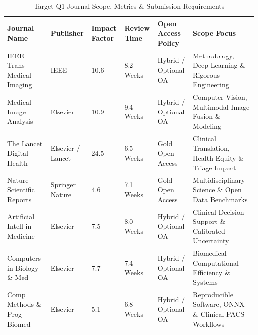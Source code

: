 \begin{table}[t]
\centering
\caption{Target Q1 Journal Scope, Metrics & Submission Requirements}
\label{tab:Table_6_04_02_Target_Journal_Comparison_Matrix}
\begin{tabular}{llllll}
\toprule
\textbf{Journal Name} & \textbf{Publisher} & \textbf{Impact Factor} & \textbf{Review Time} & \textbf{Open Access Policy} & \textbf{Scope Focus} \\
\midrule
IEEE Trans Medical Imaging & IEEE & 10.6 & 8.2 Weeks & Hybrid / Optional OA & Methodology, Deep Learning \& Rigorous Engineering \\
Medical Image Analysis & Elsevier & 10.9 & 9.4 Weeks & Hybrid / Optional OA & Computer Vision, Multimodal Image Fusion \& Modeling \\
The Lancet Digital Health & Elsevier / Lancet & 24.5 & 6.5 Weeks & Gold Open Access & Clinical Translation, Health Equity \& Triage Impact \\
Nature Scientific Reports & Springer Nature & 4.6 & 7.1 Weeks & Gold Open Access & Multidisciplinary Science \& Open Data Benchmarks \\
Artificial Intell in Medicine & Elsevier & 7.5 & 8.0 Weeks & Hybrid / Optional OA & Clinical Decision Support \& Calibrated Uncertainty \\
Computers in Biology \& Med & Elsevier & 7.7 & 7.4 Weeks & Hybrid / Optional OA & Biomedical Computational Efficiency \& Systems \\
Comp Methods \& Prog Biomed & Elsevier & 5.1 & 6.8 Weeks & Hybrid / Optional OA & Reproducible Software, ONNX \& Clinical PACS Workflows \\
\bottomrule
\end{tabular}
\end{table}
